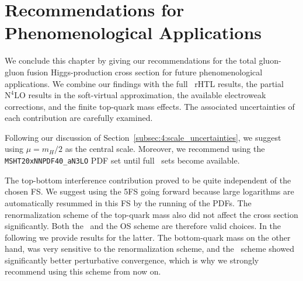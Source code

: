 \section{Recommendations for Phenomenological Applications} \label{sec:6:recommendations}
We conclude this chapter by giving our recommendations for the total gluon-gluon fusion Higgs-production cross section for future phenomenological applications. We combine our findings with the full \NNNLO\ \acs{rHTL} results, the partial $\mathrm{N}^4\mathrm{LO}$ results in the soft-virtual approximation, the available electroweak corrections, and the finite top-quark mass effects. The associated uncertainties of each contribution are carefully examined.

Following our discussion of Section~\ref{subsec:4:scale_uncertainties}, we suggest using $\mu = m_H/2$ as the central scale. Moreover, we recommend using the \texttt{MSHT20xNNPDF40\_aN3LO} \acs{PDF} set until full \NNNLO\ sets become available.

The top-bottom interference contribution proved to be quite independent of the chosen \acs{FS}. We suggest using the 5\acs{FS} going forward because large logarithms are automatically resummed in this \acs{FS} by the running of the \acs{PDF}s. The renormalization scheme of the top-quark mass also did not affect the cross section significantly. Both the \MS\ and the \acs{OS} scheme are therefore valid choices. In the following we provide results for the latter. The bottom-quark mass on the other hand, was very sensitive to the renormalization scheme, and the \MS\ scheme showed significantly better perturbative convergence, which is why we strongly recommend using this scheme from now on.

